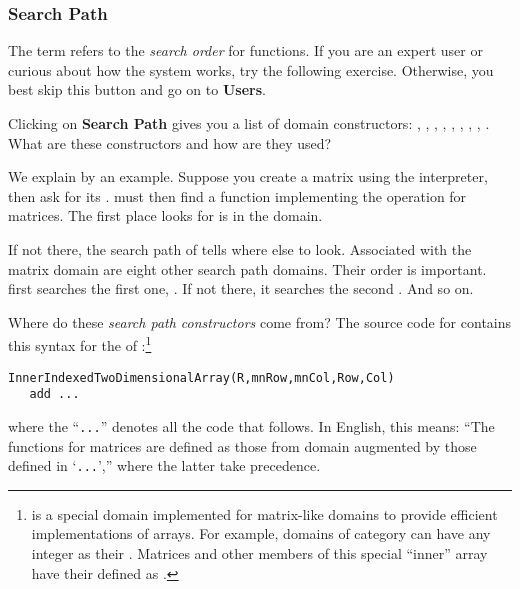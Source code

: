 \subsubsection{Search Path}

The term  refers to the {\it search order} for
functions.
If you are an expert user or curious about how the \Language{} system
works, try the following exercise.
Otherwise, you best skip this button and go on to {\bf Users}.

Clicking on {\bf Search Path} gives you a
list of domain constructors:
,
,
,
,
,
,
,
,
.
What are these constructors and how are they used?

We explain by an example.
Suppose you create a matrix using the interpreter, then ask for its
.
\Language{} must then find a function implementing the 
operation for matrices.
The first place \Language{} looks for  is in the 
domain.

If not there, the search path of  tells \Language{} where
else to look.
Associated with the matrix domain are eight other search path domains.
Their order is important.
\Language{} first searches the first one,
.
If not there, it searches the second .
And so on.

Where do these {\it search path constructors} come from?
The source code for  contains this syntax for the
 of
:\footnote{
is a special domain implemented for matrix-like domains to provide
efficient implementations of \twodim{} arrays.
For example, domains of category 
can have any integer as their .
Matrices and other members of this special ``inner'' array have their
 defined as .}
\begin{verbatim}
InnerIndexedTwoDimensionalArray(R,mnRow,mnCol,Row,Col)
   add ...
\end{verbatim}
where the ``{\tt ...}'' denotes all the code that follows.
In English, this means:
``The functions for matrices are defined as those from
 domain augmented by those
defined in `{\tt ...}','' where the latter take precedence.

